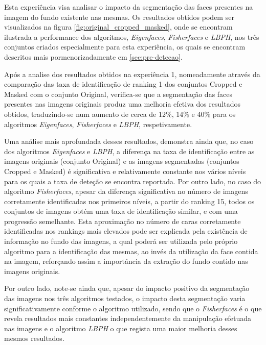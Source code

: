 Esta experiência visa analisar o impacto da segmentação das faces presentes na imagem do fundo existente nas mesmas. Os resultados obtidos podem ser visualizados na figura \ref{fig:original_cropped_masked}, onde se encontram ilustrada a performance dos algoritmos, \textit{Eigenfaces}, \textit{Fisherfaces} e \textit{LBPH}, nos três conjuntos criados especialmente para esta experiência, os quais se encontram descritos mais pormenorizadamente em \ref{sec:pre-detecao}.

Após a analise dos resultados obtidos na experiência 1, nomeadamente através da comparação das taxa de identificação de ranking 1 dos conjuntos Cropped e Masked com o conjunto Original, verifica-se que a segmentação das faces presentes nas imagens originais produz uma melhoria efetiva dos resultados obtidos, traduzindo-se num aumento de cerca de 12\%, 14\% e 40\% para os algoritmos \textit{Eigenfaces}, \textit{Fisherfaces} e \textit{LBPH}, respetivamente.

Uma análise mais aprofundada desses resultados, demonstra ainda que, no caso dos algoritmos \textit{Eigenfaces} e \textit{LBPH}, a diferença na taxa de identificação entre as imagens originais (conjunto Original) e as imagens segmentadas (conjuntos Cropped e Masked) é significativa e relativamente constante nos vários níveis para os quais a taxa de deteção se encontra reportada. Por outro lado, no caso do algoritmo \textit{Fisherfaces}, apesar da diferença significativa no número de imagens corretamente identificadas nos primeiros níveis, a partir do ranking 15, todos os conjuntos de imagens obtém uma taxa de identificação similar, e com uma progressão semelhante. Esta aproximação no número de caras corretamente identificadas nos rankings mais elevados pode ser explicada pela existência de informação no fundo das imagens, a qual poderá ser utilizada pelo próprio algoritmo para a identificação das mesmas, ao invés da utilização da face contida na imagem, reforçando assim a importância da extração do fundo contido nas imagens originais.

Por outro lado, note-se ainda que, apesar do impacto positivo da segmentação das imagens nos três algoritmos testados, o impacto desta segmentação varia significativamente conforme o algoritmo utilizado, sendo que o \textit{Fisherfaces} é o que revela resultados mais constantes independentemente da manipulação efetuada nas imagens e o algoritmo \textit{LBPH} o que regista uma maior melhoria desses mesmos resultados.

